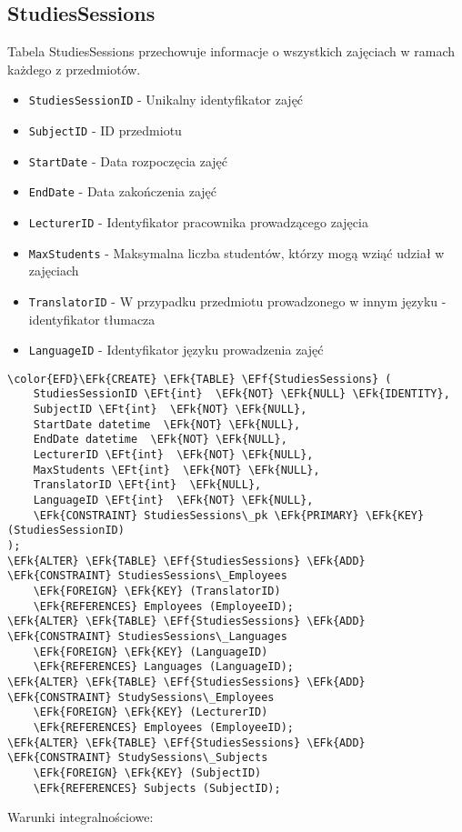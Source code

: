 \documentclass[11pt]{article}
\newcommand{\EFk}[1]{\textcolor{EFk}{\textbf{#1}}} %
\newcommand{\EFf}[1]{\textcolor{EFf}{#1}} %
\newcommand{\EFt}[1]{\textcolor{EFt}{\textbf{#1}}} %
\begin{document}
\subsection{StudiesSessions}
\label{sec:org9cbc9e6}
Tabela StudiesSessions przechowuje informacje o wszystkich zajęciach w ramach każdego z przedmiotów.
\begin{itemize}
\item \texttt{StudiesSessionID} - Unikalny identyfikator zajęć
\item \texttt{SubjectID} - ID przedmiotu
\item \texttt{StartDate} - Data rozpoczęcia zajęć
\item \texttt{EndDate} - Data zakończenia zajęć
\item \texttt{LecturerID} - Identyfikator pracownika prowadzącego zajęcia
\item \texttt{MaxStudents} - Maksymalna liczba studentów, którzy mogą wziąć udział w zajęciach
\item \texttt{TranslatorID} - W przypadku przedmiotu prowadzonego w innym języku - identyfikator tłumacza
\item \texttt{LanguageID} - Identyfikator języku prowadzenia zajęć
\end{itemize}
\begin{Code}
\begin{Verbatim}
\color{EFD}\EFk{CREATE} \EFk{TABLE} \EFf{StudiesSessions} (
    StudiesSessionID \EFt{int}  \EFk{NOT} \EFk{NULL} \EFk{IDENTITY},
    SubjectID \EFt{int}  \EFk{NOT} \EFk{NULL},
    StartDate datetime  \EFk{NOT} \EFk{NULL},
    EndDate datetime  \EFk{NOT} \EFk{NULL},
    LecturerID \EFt{int}  \EFk{NOT} \EFk{NULL},
    MaxStudents \EFt{int}  \EFk{NOT} \EFk{NULL},
    TranslatorID \EFt{int}  \EFk{NULL},
    LanguageID \EFt{int}  \EFk{NOT} \EFk{NULL},
    \EFk{CONSTRAINT} StudiesSessions\_pk \EFk{PRIMARY} \EFk{KEY}  (StudiesSessionID)
);
\EFk{ALTER} \EFk{TABLE} \EFf{StudiesSessions} \EFk{ADD} \EFk{CONSTRAINT} StudiesSessions\_Employees
    \EFk{FOREIGN} \EFk{KEY} (TranslatorID)
    \EFk{REFERENCES} Employees (EmployeeID);
\EFk{ALTER} \EFk{TABLE} \EFf{StudiesSessions} \EFk{ADD} \EFk{CONSTRAINT} StudiesSessions\_Languages
    \EFk{FOREIGN} \EFk{KEY} (LanguageID)
    \EFk{REFERENCES} Languages (LanguageID);
\EFk{ALTER} \EFk{TABLE} \EFf{StudiesSessions} \EFk{ADD} \EFk{CONSTRAINT} StudySessions\_Employees
    \EFk{FOREIGN} \EFk{KEY} (LecturerID)
    \EFk{REFERENCES} Employees (EmployeeID);
\EFk{ALTER} \EFk{TABLE} \EFf{StudiesSessions} \EFk{ADD} \EFk{CONSTRAINT} StudySessions\_Subjects
    \EFk{FOREIGN} \EFk{KEY} (SubjectID)
    \EFk{REFERENCES} Subjects (SubjectID);
\end{Verbatim}
\end{Code}
Warunki integralnościowe:
\end{document}

